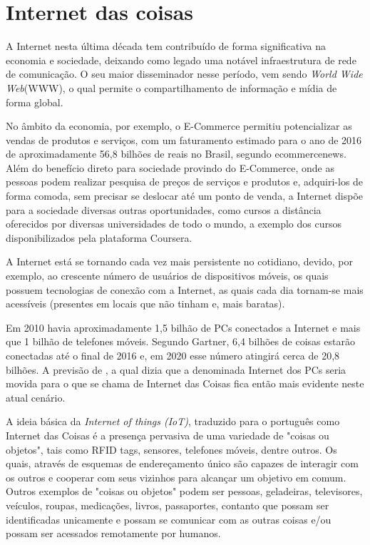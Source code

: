 \section{Internet das coisas}
\label{sec:iot}
A Internet nesta última década tem contribuído de forma significativa na economia e sociedade, deixando como legado uma notável infraestrutura de rede de comunicação. O seu maior disseminador nesse período, vem sendo \textit{World Wide Web}(WWW), o qual permite o compartilhamento de informação e mídia de forma global\cite{Chandrakanth:2014}.

No âmbito da economia, por exemplo, o E-Commerce permitiu potencializar as vendas de produtos e serviços, com um faturamento estimado para o ano de 2016 de aproximadamente 56,8 bilhões de reais no Brasil, segundo ecommercenews\footnotemark {}. Além do benefício direto para sociedade provindo do E-Commerce, onde as pessoas podem realizar pesquisa de preços de serviços e produtos e, adquiri-los de forma comoda, sem precisar se deslocar até um ponto de venda, a Internet dispõe para a sociedade diversas outras oportunidades, como cursos a distância oferecidos por diversas universidades de todo o mundo, a exemplo dos cursos disponibilizados pela plataforma Coursera\footnotemark {}. 

A Internet está se tornando cada vez mais persistente no cotidiano, devido, por exemplo, ao crescente número de usuários de dispositivos móveis, os quais possuem tecnologias de conexão com a Internet, as quais cada dia tornam-se mais acessíveis (presentes em locais que não tinham e, mais baratas)\cite{Chandrakanth:2014}.

Em 2010 havia aproximadamente 1,5 bilhão de PCs conectados a Internet e mais que 1 bilhão de telefones móveis\cite{Sundmaeker:2010}. Segundo Gartner\footnotemark {}, 6,4 bilhões de coisas estarão conectadas até o final de 2016 e, em 2020 esse número atingirá cerca de 20,8 bilhões. A previsão de \cite{Sundmaeker:2010}, a qual dizia que a denominada Internet dos PCs seria movida para o que se chama de Internet das Coisas fica então mais evidente neste atual cenário.

A ideia básica da \textit{Internet of things (IoT)}, traduzido para o português como Internet das Coisas é a presença pervasiva de uma variedade de "coisas ou objetos", tais como RFID tags, sensores, telefones móveis, dentre outros. Os quais, através de esquemas de endereçamento único são capazes de interagir com os outros e cooperar com seus vizinhos para alcançar um objetivo em comum\cite{Atzori:2010}. Outros exemplos de "coisas ou objetos" podem ser pessoas, geladeiras, televisores, veículos, roupas, medicações, livros, passaportes, contanto que possam ser identificadas unicamente e possam se comunicar com as outras coisas e/ou possam ser acessados remotamente por humanos.

